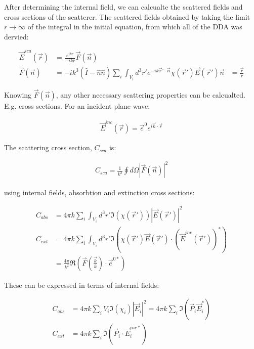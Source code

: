             After determining the internal field, we can calcualte the scattered fields and cross sections of the scatterer. The
            scattered fields obtained by taking the limit $r \rightarrow \infty$ of the integral in the initial equation, from which
            all of the DDA was dervied:

            \begin{align}
                \vec{E}^{sca}(\vec{r}) &= \frac{e^{ikr}}{-ikr}\vec{F}(\vec{n}) \\
                \vec{F}(\vec{n}) &= -ik^3\left(\hat{I}
                                    - \hat{n}\hat{n}\right)\sum_i \int_{V_i}d^3r'e^{-ik\vec{r}'\cdot\vec{n}}\chi(\vec{r}')\vec{E}(\vec{r}')
                \vec{n} &= \frac{\vec{r}}{r}
            \end{align}

            Knowing $\vec{F}(\vec{n})$, any other necessary scattering properties can be calcualted. E.g. cross sections. For
            an incident plane wave:

            \begin{align}
                \vec{E}^{inc}(\vec{r}) = \vec{e}^0 e^{i\vec{k}\cdot\vec{r}}
            \end{align}

            The scattering cross section, $C_{sca}$ is:

            \begin{align}
                C_{sca} = \frac{1}{k^2}\oint d\Omega \left|\vec{F}(\vec{n})\right|^2
            \end{align}

            using internal fields, absorbtion and extinction cross sections:

            \begin{align}
                C_{abs} &= 4\pi k \sum_i \int_{V_i} d^3r' \Im(\chi(\vec{r}'))\left|\vec{E}(\vec{r}')\right|^2\\
                C_{ext} &= 4\pi k \sum_i \int_{V_i} d^3r' \Im\left(\chi(\vec{r}')\vec{E}(\vec{r}')\cdot(\vec{E}^{inc}(\vec{r}'))^*\right) \\
                &= \frac{4\pi}{k^2}\Re\left(\vec{F}(\frac{\vec{k}}{k})\cdot\vec{e}^{0*}\right)
            \end{align}

            These can be expressed in terms of internal fields:

            \begin{align}
                C_{abs} &= 4\pi k \sum_i V_i \Im(\chi_i)|\vec{E}_i|^2 = 4\pi k \sum_i \Im(\vec{P}_i\vec{E}_i^*) \\
                C_{ext} &= 4\pi k \sum_i \Im (\vec{P}_i\cdot\vec{E}_i^{inc*})
            \end{align}

